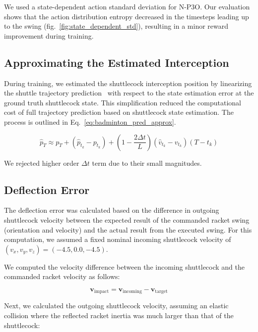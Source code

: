 \documentclass[9pt,twocolumn,twoside]{osajnl}
\begin{document}
We used a state-dependent action standard deviation \cite{andrychowicz2020matters} for \ac{N-P3O}. Our evaluation shows that the action distribution entropy decreased in the timesteps leading up to the swing (fig.~\ref{fig:state_dependent_std}), resulting in a minor reward improvement during training.


\subsection*{Approximating the Estimated Interception}

During training, we estimated the shuttlecock interception position by linearizing the shuttle trajectory prediction~\cite{cohen2015physics} with respect to the state estimation error at the ground truth shuttlecock state. This simplification reduced the computational cost of full trajectory prediction based on shuttlecock state estimation. The process is outlined in Eq.~\ref{eq:badminton_pred_approx}.

\begin{equation}
    \hat{p}_T \approx p_T + (\hat{p}_{t_k} - p_{t_k}) + (1- \frac{2\Delta t}{L})(\hat{v}_{t_k}-v_{t_k}) (T-t_k) \label{eq:badminton_pred_approx}
\end{equation}

We rejected higher order $\Delta t$ term due to their small magnitudes.


\subsection*{Deflection Error}

The deflection error was calculated based on the difference in outgoing shuttlecock velocity between the expected result of the commanded racket swing (orientation and velocity) and the actual result from the executed swing. For this computation, we assumed a fixed nominal incoming shuttlecock velocity of $(v_x, v_y, v_z) = (-4.5, 0.0, -4.5)$.

We computed the velocity difference between the incoming shuttlecock and the commanded racket velocity as follows:

\begin{equation}
    \mathbf{v}_{\text{impact}} = \mathbf{v}_{\text{incoming}} - \mathbf{v}_{\text{target}}
\end{equation}

Next, we calculated the outgoing shuttlecock velocity, assuming an elastic collision where the reflected racket inertia was much larger than that of the shuttlecock:
\end{document}
